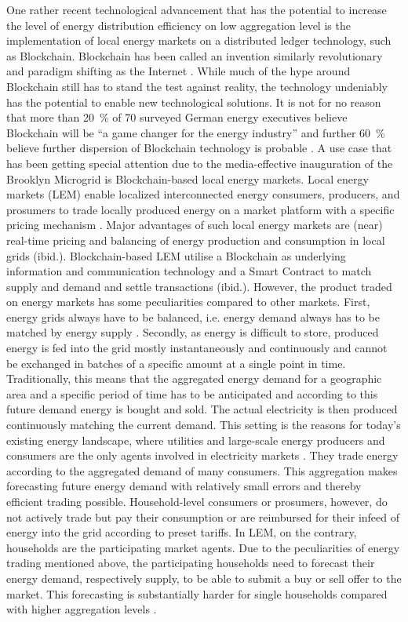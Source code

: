 One rather recent technological advancement that has the potential to increase the level of energy distribution efficiency on low aggregation level is the implementation of local energy markets on a distributed ledger technology, such as Blockchain. Blockchain has been called an invention similarly revolutionary and paradigm shifting as the Internet \citep{Swan:2015}. While much of the hype around Blockchain still has to stand the test against reality, the technology undeniably has the potential to enable new technological solutions. It is not for no reason that more than 20~\% of 70 surveyed German energy executives believe Blockchain will be “a game changer for the energy industry” and further 60~\% believe further dispersion of Blockchain technology is probable \citep{Burger:2016}. A use case that has been getting special attention due to the media-effective inauguration of the Brooklyn Microgrid \citep{newscientist:2016} is Blockchain-based local energy markets. Local energy markets (LEM) enable localized interconnected energy consumers, producers, and prosumers to trade locally produced energy on a market platform with a specific pricing mechanism \citep{Mengelkamp:2018a}. Major advantages of such local energy markets are (near) real-time pricing and balancing of energy production and consumption in local grids (ibid.). Blockchain-based LEM utilise a Blockchain as underlying information and communication technology and a Smart Contract to match supply and demand and settle transactions (ibid.).
However, the product traded on energy markets has some peculiarities compared to other markets. First, energy grids always have to be balanced, i.e. energy demand always has to be matched by energy supply \citep{Weron:2006}. Secondly, as energy is difficult to store, produced energy is fed into the grid mostly instantaneously and continuously and cannot be exchanged in batches of a specific amount at a single point in time. Traditionally, this means that the aggregated energy demand for a geographic area and a specific period of time has to be anticipated and according to this future demand energy is bought and sold. The actual electricity is then produced continuously matching the current demand. This setting is the reasons for today’s existing energy landscape, where utilities and large-scale energy producers and consumers are the only agents involved in electricity markets \citep{Weron:2006}. They trade energy according to the aggregated demand of many consumers. This aggregation makes forecasting future energy demand with relatively small errors \citep{Meer:2018, Wang:2018} and thereby efficient trading possible. Household-level consumers or prosumers, however, do not actively trade but pay their consumption or are reimbursed for their infeed of energy into the grid according to preset tariffs. In LEM, on the contrary, households are the participating market agents. Due to the peculiarities of energy trading mentioned above, the participating households need to forecast their energy demand, respectively supply, to be able to submit a buy or sell offer to the market. This forecasting is substantially harder for single households compared with higher aggregation levels \citep{Wang:2018}.
